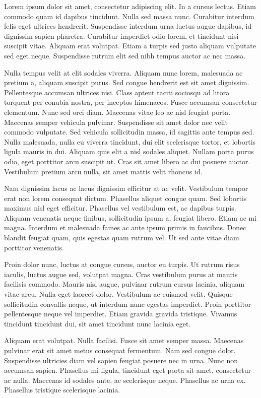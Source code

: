 Lorem ipsum dolor sit amet, consectetur adipiscing elit. In a cursus lectus. Etiam commodo quam id dapibus tincidunt. Nulla sed massa nunc. Curabitur interdum felis eget ultrices hendrerit. Suspendisse interdum urna luctus augue dapibus, id dignissim sapien pharetra. Curabitur imperdiet odio lorem, et tincidunt nisi suscipit vitae. Aliquam erat volutpat. Etiam a turpis sed justo aliquam vulputate sed eget neque. Suspendisse rutrum elit sed nibh tempus auctor ac nec massa.

Nulla tempus velit at elit sodales viverra. Aliquam nunc lorem, malesuada ac pretium a, aliquam suscipit purus. Sed congue hendrerit est sit amet dignissim. Pellentesque accumsan ultrices nisi. Class aptent taciti sociosqu ad litora torquent per conubia nostra, per inceptos himenaeos. Fusce accumsan consectetur elementum. Nunc sed orci diam. Maecenas vitae leo ac nisl feugiat porta. Maecenas semper vehicula pulvinar. Suspendisse sit amet dolor nec velit commodo vulputate. Sed vehicula sollicitudin massa, id sagittis ante tempus sed. Nulla malesuada, nulla eu viverra tincidunt, dui elit scelerisque tortor, et lobortis ligula mauris in dui. Aliquam quis elit a nisl sodales aliquet. Nullam porta purus odio, eget porttitor arcu suscipit ut. Cras sit amet libero ac dui posuere auctor. Vestibulum pretium arcu nulla, sit amet mattis velit rhoncus id.

Nam dignissim lacus ac lacus dignissim efficitur at ac velit. Vestibulum tempor erat non lorem consequat dictum. Phasellus aliquet congue quam. Sed lobortis maximus nisl eget efficitur. Phasellus vel vestibulum est, ac dapibus turpis. Aliquam venenatis neque finibus, sollicitudin ipsum a, feugiat libero. Etiam ac mi magna. Interdum et malesuada fames ac ante ipsum primis in faucibus. Donec blandit feugiat quam, quis egestas quam rutrum vel. Ut sed ante vitae diam porttitor venenatis.

Proin dolor nunc, luctus at congue cursus, auctor eu turpis. Ut rutrum risus iaculis, luctus augue sed, volutpat magna. Cras vestibulum purus at mauris facilisis commodo. Mauris nisl augue, pulvinar rutrum cursus lacinia, aliquam vitae arcu. Nulla eget laoreet dolor. Vestibulum ac euismod velit. Quisque sollicitudin convallis neque, ut interdum nunc egestas imperdiet. Proin porttitor pellentesque neque vel imperdiet. Etiam gravida gravida tristique. Vivamus tincidunt tincidunt dui, sit amet tincidunt nunc lacinia eget.

Aliquam erat volutpat. Nulla facilisi. Fusce sit amet semper massa. Maecenas pulvinar erat sit amet metus consequat fermentum. Nam sed congue dolor. Suspendisse ultricies diam vel sapien feugiat posuere nec in urna. Nunc non accumsan sapien. Phasellus mi ligula, tincidunt eget porta sit amet, consectetur ac nulla. Maecenas id sodales ante, ac scelerisque neque. Phasellus ac urna ex. Phasellus tristique scelerisque lacinia.
